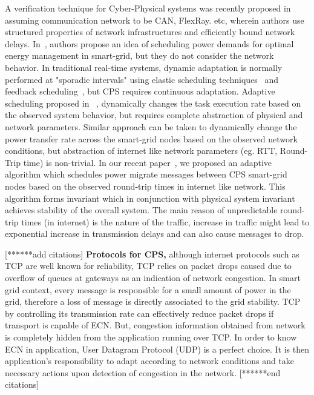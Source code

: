 A verification technique for Cyber-Physical systems was recently proposed in~\cite{DAC_2012_CPS_verification} assuming communication network to be CAN, FlexRay. etc, wherein authors use structured properties of network infrastructures and efficiently bound network delays. 
In~\cite{SmartGridLoadScheduling}, authors propose an idea of scheduling power demands for optimal energy management in smart-grid, but they do not consider the network behavior. In traditional real-time systems, dynamic adaptation is normally performed at "sporadic intervals" using elastic scheduling techniques~\cite{Buttazzo_IEEE_Jornl_2002} and feedback scheduling~\cite{FeedbackScheduling07}, but CPS requires continuous adaptation. Adaptive scheduling proposed in ~\cite{AdaptiveScheduling_DASC_1999}, dynamically changes the task execution rate based on the observed system behavior, but requires complete abstraction of physical and network parameters. Similar approach can be taken to dynamically change the power transfer rate across the smart-grid nodes based on the observed network conditions, but abstraction of internet like network parameters (eg. RTT, Round-Trip time) is non-trivial. In our recent paper~\cite{acsmartgrid}, we proposed an adaptive algorithm which schedules power migrate messages between CPS smart-grid nodes based on the observed round-trip times in internet like network. This algorithm forms invariant which in conjunction with physical system invariant achieves stability of the overall system. The main reason of unpredictable round-trip times (in internet) is the nature of the traffic, increase in traffic might lead to exponential increase in transmission delays and can also cause messages to drop.

[******add citations]
{\bf Protocols for CPS,} although internet protocols such as TCP are well known for reliability, TCP relies on packet drops caused due to overflow of queues at gateways as an indication of network congestion. 
In smart grid context, every message is responsible for a small amount of power in the
grid, therefore a loss of message is directly associated to the grid stability. TCP by controlling 
its transmission rate can effectively reduce packet drops if transport is capable of ECN.
But, congestion information obtained from network is completely hidden from the application
running over TCP. In order to know ECN in application, User Datagram Protocol (UDP) is a perfect choice.
It is then application's responsibility to adapt according to network conditions and take 
necessary actions upon detection of congestion in the network.
[******end citations]

